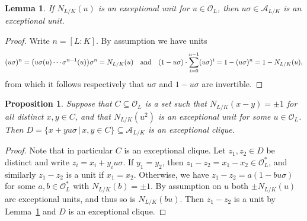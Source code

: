 \documentclass{amsart}
\theoremstyle{plain}
\newtheorem{lemma}[theorem]{Lemma}
\newtheorem{proposition}[theorem]{Proposition}
\theoremstyle{definition}
\newcommand{\clq}{C}
\newcommand{\clqb}{D}
\begin{document}
\begin{lemma}\label{lem:unit_norm}
	If \(N_{L/K}(u)\) is an exceptional unit for \(u\in \mathcal{O}_L\), then \(u\sigma\in \mathcal{A}_{L/K}\) is an exceptional unit.
\end{lemma}
\begin{proof}
	Write $n=[L:K]$. By assumption we have units
	\[ (u\sigma)^n = \big(u\sigma(u)\dotsm \sigma^{n-1}(u)\big) \sigma^n= N_{L/K}(u) \quad\textup{and}\quad (1-u\sigma)\cdot \sum_{i=0}^{n-1} (u\sigma)^i = 1 - (u\sigma)^n=1-N_{L/K}(u),\]
	from which it follows respectively that \(u\sigma\) and \(1-u\sigma\) are invertible.
\end{proof}

\begin{proposition}\label{prop:nt_square_clique}
	Suppose that \(\clq\subseteq \mathcal{O}_L\) is a set such that \(N_{L/K}(x-y)=\pm1\) for all distinct \(x,y\in \clq\), and that \(N_{L/K}(u^2)\) is an exceptional unit for some \(u\in \mathcal{O}_L\). Then \(\clqb=\{x+yu\sigma\,|\, x,y\in \clq\}\subseteq\mathcal{A}_{L/K}\) is an exceptional clique.
\end{proposition}
\begin{proof}
	Note that in particular \(\clq\) is an exceptional clique.
	Let \(z_1,z_2\in \clqb\) be distinct and write \(z_i=x_i+y_iu\sigma\). If \(y_1=y_2\), then \(z_1-z_2=x_1-x_2\in \mathcal{O}_L^*\), and similarly \(z_1-z_2\) is a unit if \(x_1=x_2\). Otherwise, we have \(z_1-z_2=a(1-bu\sigma)\) for some \(a,b\in\mathcal{O}_L^*\) with \(N_{L/K}(b)=\pm1\).
	By assumption on \(u\) both \(\pm N_{L/K}(u)\) are exceptional units, and thus so is \(N_{L/K}(bu)\).
	Then \(z_1-z_2\) is a unit by Lemma~\ref{lem:unit_norm} and \(\clqb\) is an exceptional clique.
\end{proof}
\end{document}
